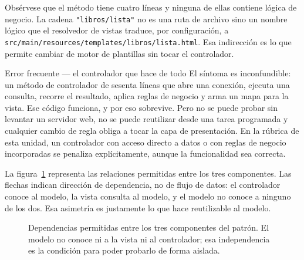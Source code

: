 \documentclass[11pt,a4paper,openany]{book}
\begin{document}
Obsérvese que el método tiene cuatro líneas y ninguna de ellas contiene lógica de negocio. La cadena \texttt{"libros/lista"} no es una ruta de archivo sino un nombre lógico que el resolvedor de vistas traduce, por configuración, a \texttt{src/main/resources/templates/libros/lista.html}. Esa indirección es lo que permite cambiar de motor de plantillas sin tocar el controlador.

\begin{cajaadvertencia}{Error frecuente --- el controlador que hace de todo}
	El síntoma es inconfundible: un método de controlador de sesenta líneas que abre una conexión, ejecuta una consulta, recorre el resultado, aplica reglas de negocio y arma un mapa para la vista. Ese código funciona, y por eso sobrevive. Pero no se puede probar sin levantar un servidor web, no se puede reutilizar desde una tarea programada y cualquier cambio de regla obliga a tocar la capa de presentación. En la rúbrica de esta unidad, un controlador con acceso directo a datos o con reglas de negocio incorporadas se penaliza explícitamente, aunque la funcionalidad sea correcta.
\end{cajaadvertencia}

La figura~\ref{fig:u4:triada} representa las relaciones permitidas entre los tres componentes. Las flechas indican dirección de dependencia, no de flujo de datos: el controlador conoce al modelo, la vista consulta al modelo, y el modelo no conoce a ninguno de los dos. Esa asimetría es justamente lo que hace reutilizable al modelo.

\begin{figure}[htbp]
	\centering
	\caption{Dependencias permitidas entre los tres componentes del patrón. El modelo no conoce ni a la vista ni al controlador; esa independencia es la condición para poder probarlo de forma aislada.}
	\label{fig:u4:triada}
\end{figure}
\end{document}
